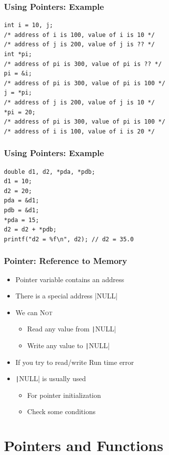 \documentclass{../c-lecture}
\begin{document}
\begin{frame}[fragile]
  \frametitle{Using Pointers: Example}
  \begin{verbatim}
int i = 10, j;
/* address of i is 100, value of i is 10 */
/* address of j is 200, value of j is ?? */
int *pi;
/* address of pi is 300, value of pi is ?? */
pi = &i;
/* address of pi is 300, value of pi is 100 */
j = *pi;
/* address of j is 200, value of j is 10 */
*pi = 20;
/* address of pi is 300, value of pi is 100 */
/* address of i is 100, value of i is 20 */
  \end{verbatim}
\end{frame}

\begin{frame}[fragile]
  \frametitle{Using Pointers: Example}
  \begin{verbatim}
double d1, d2, *pda, *pdb;
d1 = 10;
d2 = 20;
pda = &d1;
pdb = &d1;
*pda = 15;
d2 = d2 + *pdb;
printf("d2 = %f\n", d2); // d2 = 35.0
  \end{verbatim}
\end{frame}

\begin{frame}
  \frametitle{Pointer: Reference to Memory}
  \begin{itemize}
    \item Pointer variable contains an address
    \item There is a special address
    |NULL|
    \item We can \textsc{\color{RubineRed} Not}
    \begin{itemize}
      \item Read any value from \texttt|NULL|
      \item Write any value to \texttt|NULL|
    \end{itemize}
    \item If you try to read/write \textrightarrow Run time error
    \item \texttt|NULL| is usually used
    \begin{itemize}
      \item For pointer initialization
      \item Check some conditions
    \end{itemize}
  \end{itemize}
\end{frame}

\section{Pointers and Functions}
\end{document}
